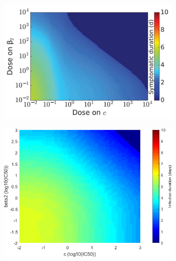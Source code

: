 \documentclass[a4paper,11pt]{article}
\begin{document}
\begin{figure}[H]
\begin{subfigure}{0.4\textwidth}
    \includegraphics[width=\textwidth]{MBeta2CT.png}
    \end{subfigure}
    \begin{subfigure}{0.35\textwidth}
    
    \includegraphics[width=\textwidth]{Beta2C_times.png}
    \end{subfigure}
    
    \begin{subfigure}{0.4\textwidth}
    

\end{subfigure}
\end{figure}
\end{document}
